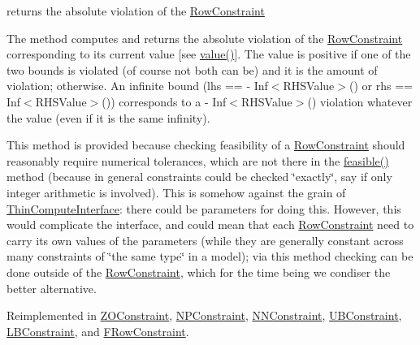 returns the absolute violation of the \mbox{\hyperlink{class_s_m_spp__di__unipi__it_1_1_row_constraint}{Row\+Constraint}} 

The method computes and returns the absolute violation of the \mbox{\hyperlink{class_s_m_spp__di__unipi__it_1_1_row_constraint}{Row\+Constraint}} corresponding to its current value \mbox{[}see \mbox{\hyperlink{class_s_m_spp__di__unipi__it_1_1_row_constraint_a42562ba0a608bdc52a80a2bb512d0603}{value()}}\mbox{]}. The value is positive if one of the two bounds is violated (of course not both can be) and it is the amount of violation; otherwise. An infinite bound (lhs == -\/ Inf$<$\+R\+H\+S\+Value$>$() or rhs == Inf$<$\+R\+H\+S\+Value$>$()) corresponds to a -\/ Inf$<$\+R\+H\+S\+Value$>$() violation whatever the value (even if it is the same infinity).

This method is provided because checking feasibility of a \mbox{\hyperlink{class_s_m_spp__di__unipi__it_1_1_row_constraint}{Row\+Constraint}} should reasonably require numerical tolerances, which are not there in the \mbox{\hyperlink{class_s_m_spp__di__unipi__it_1_1_constraint_a29e571bbd4e2f1046c56e39c06633c4c}{feasible()}} method (because in general constraints could be checked \char`\"{}exactly\char`\"{}, say if only integer arithmetic is involved). This is somehow against the grain of \mbox{\hyperlink{class_s_m_spp__di__unipi__it_1_1_thin_compute_interface}{Thin\+Compute\+Interface}}\+: there could be parameters for doing this. However, this would complicate the interface, and could mean that each \mbox{\hyperlink{class_s_m_spp__di__unipi__it_1_1_row_constraint}{Row\+Constraint}} need to carry its own values of the parameters (while they are generally constant across many constraints of \char`\"{}the same type\char`\"{} in a model); via this method checking can be done outside of the \mbox{\hyperlink{class_s_m_spp__di__unipi__it_1_1_row_constraint}{Row\+Constraint}}, which for the time being we condiser the better alternative. 

Reimplemented in \mbox{\hyperlink{class_s_m_spp__di__unipi__it_1_1_z_o_constraint_a1e06e555eab5078e4d5ec16745778984}{Z\+O\+Constraint}}, \mbox{\hyperlink{class_s_m_spp__di__unipi__it_1_1_n_p_constraint_a1e06e555eab5078e4d5ec16745778984}{N\+P\+Constraint}}, \mbox{\hyperlink{class_s_m_spp__di__unipi__it_1_1_n_n_constraint_a1e06e555eab5078e4d5ec16745778984}{N\+N\+Constraint}}, \mbox{\hyperlink{class_s_m_spp__di__unipi__it_1_1_u_b_constraint_a1e06e555eab5078e4d5ec16745778984}{U\+B\+Constraint}}, \mbox{\hyperlink{class_s_m_spp__di__unipi__it_1_1_l_b_constraint_a1e06e555eab5078e4d5ec16745778984}{L\+B\+Constraint}}, and \mbox{\hyperlink{class_s_m_spp__di__unipi__it_1_1_f_row_constraint_a0d579ce7c4e40b1a0dc2dfc849942fb1}{F\+Row\+Constraint}}.

